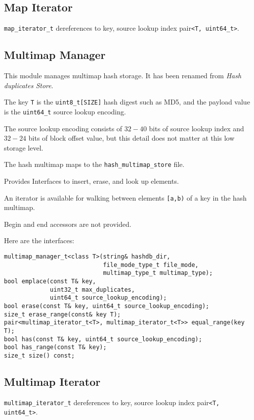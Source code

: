 \documentclass[12pt,twoside]{article}
\begin{document}
\subsection{Map Iterator}
\texttt{map\_iterator\_t} dereferences to
key, source lookup index pair\texttt{<T, uint64\_t>}.

\subsection{Multimap Manager}
This module manages multimap hash storage.
It has been renamed from \textit{Hash duplicates Store}.
\begin{compactitem}
\item The key \texttt{T} is the \texttt{uint8\_t[SIZE]} hash digest such as MD5,
and the payload value is the \texttt{uint64\_t} source lookup encoding.
\item The source lookup encoding consists of $32-40$ bits
of source lookup index and $32-24$ bits of block offset value,
but this detail does not matter at this low storage level.
\item The hash multimap maps to the \texttt{hash\_multimap\_store} file.
\item Provides Interfaces to insert, erase, and look up elements.
\item An iterator is available for walking
between elements \texttt{[a,b)} of a key in the hash multimap.
\item Begin and end accessors are not provided.
\end{compactitem}

Here are the interfaces:
\begin{small}
\begin{verbatim}
multimap_manager_t<class T>(string& hashdb_dir,
                            file_mode_type_t file_mode,
                            multimap_type_t multimap_type);
bool emplace(const T& key,
             uint32_t max_duplicates,
             uint64_t source_lookup_encoding);
bool erase(const T& key, uint64_t source_lookup_encoding);
size_t erase_range(const& key T);
pair<multimap_iterator_t<T>, multimap_iterator_t<T>> equal_range(key T);
bool has(const T& key, uint64_t source_lookup_encoding);
bool has_range(const T& key);
size_t size() const;
\end{verbatim}
\end{small}

\subsection{Multimap Iterator}
\texttt{multimap\_iterator\_t} dereferences to
key, source lookup index pair\texttt{<T, uint64\_t>}.
\end{document}
